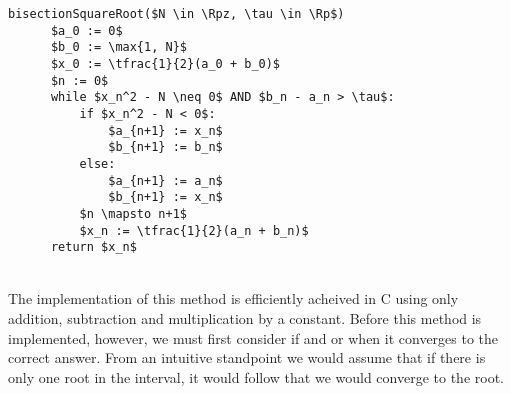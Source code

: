 \begin{lstlisting}[frame=single,mathescape,caption={Bisection Method for Square Roots},label={PCD_"Square Root Bisection Method"}]
  bisectionSquareRoot($N \in \Rpz, \tau \in \Rp$)
      $a_0 := 0$
      $b_0 := \max{1, N}$
      $x_0 := \tfrac{1}{2}(a_0 + b_0)$
      $n := 0$
      while $x_n^2 - N \neq 0$ AND $b_n - a_n > \tau$:
          if $x_n^2 - N < 0$:
              $a_{n+1} := x_n$
              $b_{n+1} := b_n$
          else:
              $a_{n+1} := a_n$
              $b_{n+1} := x_n$
          $n \mapsto n+1$
          $x_n := \tfrac{1}{2}(a_n + b_n)$
      return $x_n$
\end{lstlisting}\\

The implementation of this method is efficiently acheived in C using only addition, subtraction and multiplication by a constant. Before this method is implemented, however, we must first consider if and or when it converges to the correct answer. From an intuitive standpoint we would assume that if there is only one root in the interval, it would follow that we would converge to the root.

